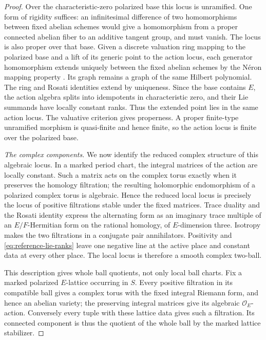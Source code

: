 \begin{proof}
Over the characteristic-zero polarized base this locus is unramified.
One form of rigidity suffices: an infinitesimal difference of two
homomorphisms between fixed abelian schemes would give a homomorphism
from a proper connected abelian fiber to an additive tangent group,
and must vanish.  The locus is also proper over that base.  Given a
discrete valuation ring mapping to the polarized base and a lift of
its generic point to the action locus, each
generator homomorphism extends uniquely between the fixed abelian
schemes by the Néron mapping property
\cite[\S1.2, Definition~1 and Proposition~8]{BoschLutkebohmertRaynaud1990}.
Its graph remains a graph of the same Hilbert polynomial.  The ring
and Rosati identities extend by uniqueness.  Since the base contains
\(E\), the action algebra splits into idempotents in characteristic
zero, and their Lie summands have locally constant ranks.  Thus the
extended point lies in the same action locus.  The valuative criterion
gives properness.  A proper finite-type unramified morphism is
quasi-finite and hence finite, so the action locus is finite over the
polarized base.

\emph{The complex components.}
We now identify the reduced complex structure of this algebraic locus.
In a marked period chart,
the integral matrices of the action are locally constant.  Such a
matrix acts on the complex torus exactly when it preserves the
homology filtration; the resulting holomorphic endomorphism of a
polarized complex torus is algebraic.  Hence the reduced local locus
is precisely the locus of positive filtrations stable under the fixed
matrices.  Trace duality and the Rosati identity express the
alternating form as an imaginary trace multiple of an
\(E/F\)-Hermitian form on the rational homology, of \(E\)-dimension
three.  Isotropy makes the two filtrations in a conjugate pair
annihilators.  Positivity and \eqref{eq:reference-lie-ranks} leave one
negative line at the active place and constant data at every other
place.  The local locus is therefore a smooth complex two-ball.

This description gives whole ball quotients, not only local ball
charts.  Fix a marked polarized \(E\)-lattice occurring in \(S\).
Every positive filtration in its compatible ball gives a complex
torus with the fixed integral Riemann form, and hence an abelian
variety; the preserving integral matrices give its algebraic
\(\mathcal O_E\)-action.  Conversely every tuple with these lattice
data gives such a filtration.  Its connected component is thus the
quotient of the whole ball by the marked lattice stabilizer.


\end{proof}
